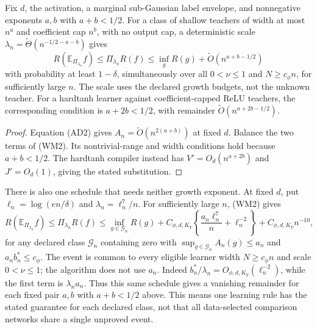 \begin{corollary}
\label{cor:all-d-growing-resources}
Fix $d$, the activation, a marginal sub-Gaussian label envelope, and
nonnegative exponents $a,b$ with $a+b<1/2$. For a class of shallow
teachers of width at most $n^a$ and coefficient cap $n^b$, with no
output cap, a deterministic scale
$\lambda_n=\widetilde\Theta(n^{-1/2-a-b})$ gives
\[
 R(\mathbb E_{\Pi_{\lambda_n}}f)\le\Pi_{\lambda_n}R(f)
 \le\inf_g R(g)+\widetilde O(n^{a+b-1/2})
\]
with probability at least $1-\delta$, simultaneously over all
$0<\nu\le1$ and $N\ge c_\phi n$, for sufficiently large $n$.
The scale uses the declared growth budgets, not the unknown teacher.
For a hardtanh learner against coefficient-capped ReLU teachers, the
corresponding condition is $a+2b<1/2$, with remainder
$\widetilde O(n^{a+2b-1/2})$.
\end{corollary}
\begin{proof}
Equation (AD2) gives $A_n=\widetilde O(n^{2(a+b)})$ at fixed $d$.
Balance the two terms of (WM2). Its nontrivial-range and width conditions
hold because $a+b<1/2$. The hardtanh compiler instead has
$V'=O_d(n^{a+2b})$ and $J'=O_d(1)$, giving the stated substitution.
\end{proof}

There is also one schedule that needs neither growth exponent. At fixed
$d$, put $\ell_n=\log(e n/\delta)$ and
$\lambda_n=\ell_n^7/n$. For sufficiently large $n$, (WM2) gives
\begin{equation}
 R(\mathbb E_{\Pi_{\lambda_n}}f)\le\Pi_{\lambda_n}R(f)
 \le\inf_{g\in\mathcal G_n}R(g)
 +C_{\phi,d,K_Y}\left\{\frac{a_n\ell_n^7}{n}+\ell_n^{-2}\right\}
 +C_{\phi,d,K_Y}n^{-10},                              \tag{WM8}
\end{equation}
for any declared class $\mathcal G_n$ containing zero with
$\sup_{g\in\mathcal G_n}A_n(g)\le a_n$ and
$a_n b_n^*\le c_\phi$. The event is common to every eligible learner
width $N\ge c_\phi n$ and scale $0<\nu\le1$; the algorithm does not
use $a_n$. Indeed $b_n^*/\lambda_n=O_{\phi,d,K_Y}(\ell_n^{-2})$,
while the first term is $\lambda_n a_n$. Thus this same schedule gives
a vanishing remainder for each fixed pair $a,b$ with $a+b<1/2$ above.
This means one learning rule has the stated guarantee for each declared
class, not that all data-selected comparison networks share a single
unproved event.
